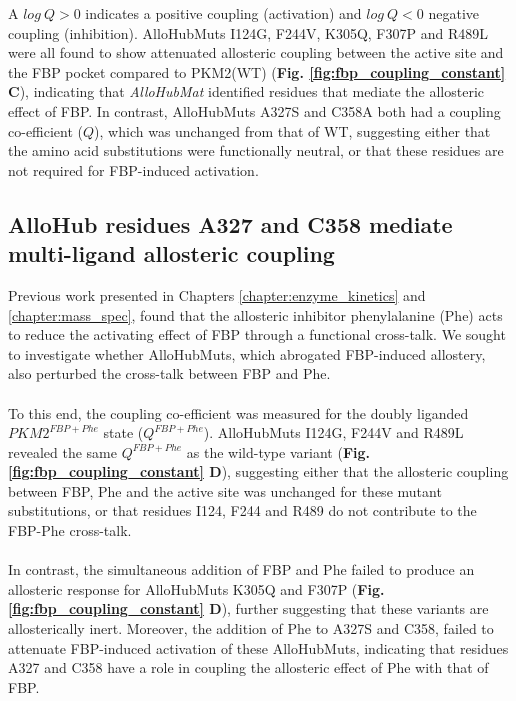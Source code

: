 %
%
A $log \: Q>0$ indicates a positive coupling (activation) and $log \: Q<0$ negative coupling (inhibition). AlloHubMuts I124G, F244V, K305Q, F307P and R489L were all found to show attenuated allosteric coupling between the active site and the FBP pocket compared to PKM2(WT) (\textbf{Fig. \ref{fig:fbp_coupling_constant} C}), indicating that \textit{AlloHubMat} identified residues that mediate the allosteric effect of FBP. In contrast, AlloHubMuts A327S and C358A both had a coupling co-efficient ($Q$), which was unchanged from that of WT, suggesting either that the amino acid substitutions were functionally neutral, or that these residues are not required for FBP-induced activation.


\subsection{AlloHub residues A327 and C358 mediate multi-ligand allosteric coupling}
\label{subsec:allohubmuts_phe}
Previous work presented in Chapters \ref{chapter:enzyme_kinetics} and \ref{chapter:mass_spec}, found that the allosteric inhibitor phenylalanine (Phe) acts to reduce the activating effect of FBP through a functional cross-talk. We sought to investigate whether AlloHubMuts, which abrogated FBP-induced allostery, also perturbed the cross-talk between FBP and Phe. 
%
%
\\\\
%
%
To this end, the coupling co-efficient was measured for the doubly liganded $PKM2^{FBP+Phe}$ state ($Q^{FBP+Phe}$). AlloHubMuts I124G, F244V and R489L revealed the same $Q^{FBP+Phe}$ as the wild-type variant (\textbf{Fig. \ref{fig:fbp_coupling_constant} D}), suggesting either that the allosteric coupling between FBP, Phe and the active site was unchanged for these mutant substitutions, or that residues I124, F244 and R489 do not contribute to the FBP-Phe cross-talk. 
%
%
\\\\
%
%
In contrast, the simultaneous addition of FBP and Phe failed to produce an allosteric response for AlloHubMuts K305Q and F307P (\textbf{Fig. \ref{fig:fbp_coupling_constant} D}), further suggesting that these variants are allosterically inert. Moreover, the addition of Phe to A327S and C358, failed to attenuate FBP-induced activation of these AlloHubMuts, indicating that residues A327 and C358 have a role in coupling the allosteric effect of Phe with that of FBP.
%
%
%
%
%
%

